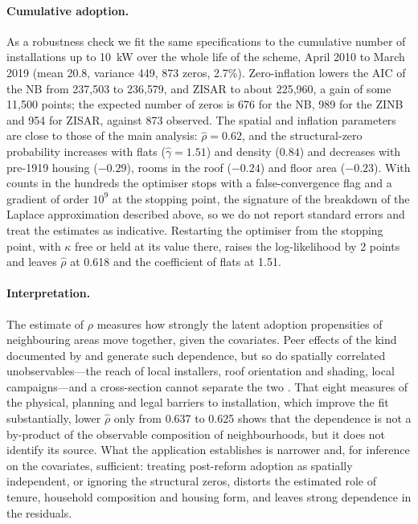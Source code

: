 \paragraph{Cumulative adoption.}
As a robustness check we fit the same specifications to the cumulative number of installations up to 10~kW over the whole life of the scheme, April 2010 to March 2019 (mean 20.8, variance 449, 873 zeros, 2.7\%).
Zero-inflation lowers the AIC of the NB from 237{,}503 to 236{,}579, and ZISAR to about 225{,}960, a gain of some 11{,}500 points; the expected number of zeros is 676 for the NB, 989 for the ZINB and 954 for ZISAR, against 873 observed.
The spatial and inflation parameters are close to those of the main analysis: $\hat\rho = 0.62$, and the structural-zero probability increases with flats ($\hat\gamma = 1.51$) and density ($0.84$) and decreases with pre-1919 housing ($-0.29$), rooms in the roof ($-0.24$) and floor area ($-0.23$).
With counts in the hundreds the optimiser stops with a false-convergence flag and a gradient of order $10^9$ at the stopping point, the signature of the breakdown of the Laplace approximation described above, so we do not report standard errors and treat the estimates as indicative.
Restarting the optimiser from the stopping point, with $\kappa$ free or held at its value there, raises the log-likelihood by 2 points and leaves $\hat\rho$ at 0.618 and the coefficient of flats at 1.51.

\paragraph{Interpretation.}
The estimate of $\rho$ measures how strongly the latent adoption propensities of neighbouring areas move together, given the covariates.
Peer effects of the kind documented by \citet{bollinger_gillingham2012} and \citet{graziano_gillingham2015} generate such dependence, but so do spatially correlated unobservables---the reach of local installers, roof orientation and shading, local campaigns---and a cross-section cannot separate the two \citep{manski1993,gibbons_overman2012}.
That eight measures of the physical, planning and legal barriers to installation, which improve the fit substantially, lower $\hat\rho$ only from 0.637 to 0.625 shows that the dependence is not a by-product of the observable composition of neighbourhoods, but it does not identify its source.
What the application establishes is narrower and, for inference on the covariates, sufficient: treating post-reform adoption as spatially independent, or ignoring the structural zeros, distorts the estimated role of tenure, household composition and housing form, and leaves strong dependence in the residuals.

